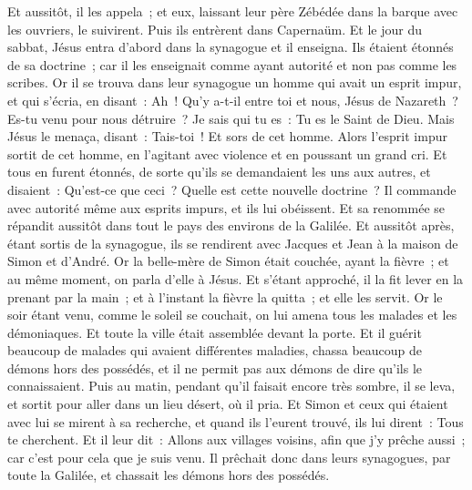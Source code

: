 \begin{multicols}{2}
Et aussitôt, il les appela~; et eux, laissant leur père Zébédée dans la barque avec les ouvriers, le suivirent.
Puis ils entrèrent dans Capernaüm. Et le jour du sabbat, Jésus entra d'abord dans la synagogue et il enseigna.
Ils étaient étonnés de sa doctrine~; car il les enseignait comme ayant autorité et non pas comme les scribes.
Or il se trouva dans leur synagogue un homme qui avait un esprit impur, et qui s'écria,
en disant~: Ah~! Qu'y a-t-il entre toi et nous, Jésus de Nazareth~? Es-tu venu pour nous détruire~? Je sais qui tu es~: Tu es le Saint de Dieu.
Mais Jésus le menaça, disant~: Tais-toi~! Et sors de cet homme.
Alors l'esprit impur sortit de cet homme, en l'agitant avec violence et en poussant un grand cri.
Et tous en furent étonnés, de sorte qu'ils se demandaient les uns aux autres, et disaient~: Qu'est-ce que ceci~? Quelle est cette nouvelle doctrine~? Il commande avec autorité même aux esprits impurs, et ils lui obéissent.
Et sa renommée se répandit aussitôt dans tout le pays des environs de la Galilée.
Et aussitôt après, étant sortis de la synagogue, ils se rendirent avec Jacques et Jean à la maison de Simon et d'André.
Or la belle-mère de Simon était couchée, ayant la fièvre~; et au même moment, on parla d'elle à Jésus.
Et s'étant approché, il la fit lever en la prenant par la main~; et à l'instant la fièvre la quitta~; et elle les servit.
Or le soir étant venu, comme le soleil se couchait, on lui amena tous les malades et les démoniaques.
Et toute la ville était assemblée devant la porte.
Et il guérit beaucoup de malades qui avaient différentes maladies, chassa beaucoup de démons hors des possédés, et il ne permit pas aux démons de dire qu'ils le connaissaient.
Puis au matin, pendant qu'il faisait encore très sombre, il se leva, et sortit pour aller dans un lieu désert, où il pria.
Et Simon et ceux qui étaient avec lui se mirent à sa recherche,
et quand ils l'eurent trouvé, ils lui dirent~: Tous te cherchent.
Et il leur dit~: Allons aux villages voisins, afin que j'y prêche aussi~; car c'est pour cela que je suis venu.
Il prêchait donc dans leurs synagogues, par toute la Galilée, et chassait les démons hors des possédés.

\end{multicols}
